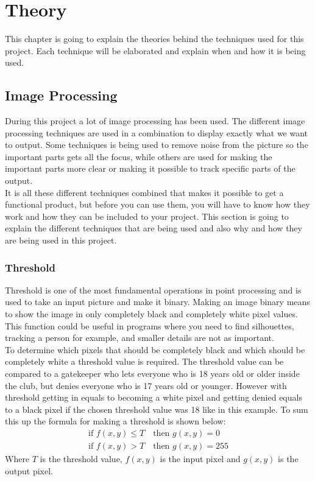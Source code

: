 \chapter{Theory}
This chapter is going to explain the theories behind the techniques used for this project. Each technique will be elaborated and explain when and how it is being used.
\section{Image Processing}
During this project a lot of image processing has been used. The different image processing techniques are used in a combination to display exactly what we want to output. Some techniques is being used to remove noise from the picture so the important parts gets all the focus, while others are used for making the important parts more clear or making it possible to track specific parts of the output. \\
It is all these different techniques combined that makes it possible to get a functional product, but before you can use them, you will have to know how they work and how they can be included to your project. This section is going to explain the different techniques that are being used and also why and how they are being used in this project.
\subsection{Threshold}
Threshold is one of the most fundamental operations in point processing and is used to take an input picture and make it binary. Making an image binary means to show the image in only completely black and completely white pixel values. \\
This function could be useful in programs where you need to find silhouettes, tracking a person for example, and smaller details are not as important. \\
To determine which pixels that should be completely black and which should be completely white a threshold value is required. The threshold value can be compared to a gatekeeper who lets everyone who is 18 years old or older inside the club, but denies everyone who is 17 years old or younger. However with threshold getting in equals to becoming a white pixel and getting denied equals to a black pixel if the chosen threshold value was 18 like in this example. To sum this up the formula for making a threshold is shown below:
\begin{equation}
  \begin{aligned}
  	\text{if } f(x,y)\leq T \quad \text{then } g(x,y)=0 \\
  	\text{if } f(x,y)>T \quad \text{then } g(x,y)=255
  \end{aligned} 
\end{equation}
Where $T$ is the threshold value, $f(x,y)$ is the input pixel and $g(x,y)$ is the output pixel. 

